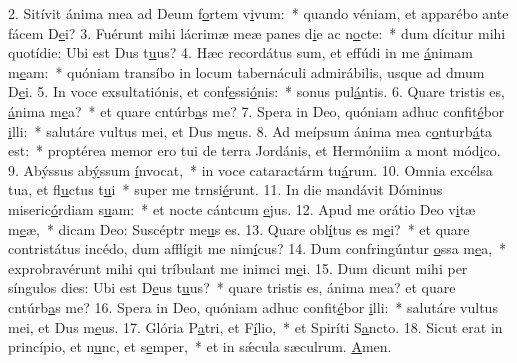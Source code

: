 2. Sitívit ánima mea ad Deum f\uline{o}rtem v\uline{i}vum:~* quando véniam, et apparébo ante fácem D\uline{e}i?
3. Fuérunt mihi lácrimæ meæ panes d\uline{i}e ac n\uline{o}cte:~* dum dícitur mihi quotídie: Ubi est Dus t\uline{u}us?
4. Hæc recordátus sum, et effúdi in me \uline{á}nimam m\uline{e}am:~* quóniam transíbo in locum tabernáculi admirábilis, usque ad dmum D\uline{e}i.
5. In voce exsultatiónis, et conf\uline{e}ssi\uline{ó}nis:~* sonus pul\uline{á}ntis.
6. Quare tristis es, \uline{á}nima m\uline{e}a?~* et quare cntúrb\uline{a}s me?
7. Spera in Deo, quóniam adhuc confit\uline{é}bor \uline{i}lli:~* salutáre vultus mei, et Dus m\uline{e}us.
8. Ad meípsum ánima mea c\uline{o}nturb\uline{á}ta est:~* proptérea memor ero tui de terra Jordánis, et Hermóniim a mont mód\uline{i}co.
9. Abýssus ab\uline{ý}ssum \uline{í}nvocat,~* in voce cataractárm tu\uline{á}rum.
10. Omnia excélsa tua, et fl\uline{u}ctus t\uline{u}i~* super me trnsi\uline{é}runt.
11. In die mandávit Dóminus miseric\uline{ó}rdiam s\uline{u}am:~* et nocte cántcum \uline{e}jus.
12. Apud me orátio Deo v\uline{i}tæ m\uline{e}æ,~* dicam Deo: Suscéptr me\uline{u}s es.
13. Quare obl\uline{í}tus es m\uline{e}i?~* et quare contristátus incédo, dum afflígit me nim\uline{í}cus?
14. Dum confringúntur \uline{o}ssa m\uline{e}a,~* exprobravérunt mihi qui tríbulant me inimci m\uline{e}i.
15. Dum dicunt mihi per síngulos dies: Ubi est D\uline{e}us t\uline{u}us?~* quare tristis es, ánima mea? et quare cntúrb\uline{a}s me?
16. Spera in Deo, quóniam adhuc confit\uline{é}bor \uline{i}lli:~* salutáre vultus mei, et Dus m\uline{e}us.
17. Glória P\uline{a}tri, et F\uline{í}lio,~* et Spiríti S\uline{a}ncto.
18. Sicut erat in princípio, et n\uline{u}nc, et s\uline{e}mper,~* et in sǽcula sæculrum. \uline{A}men.
